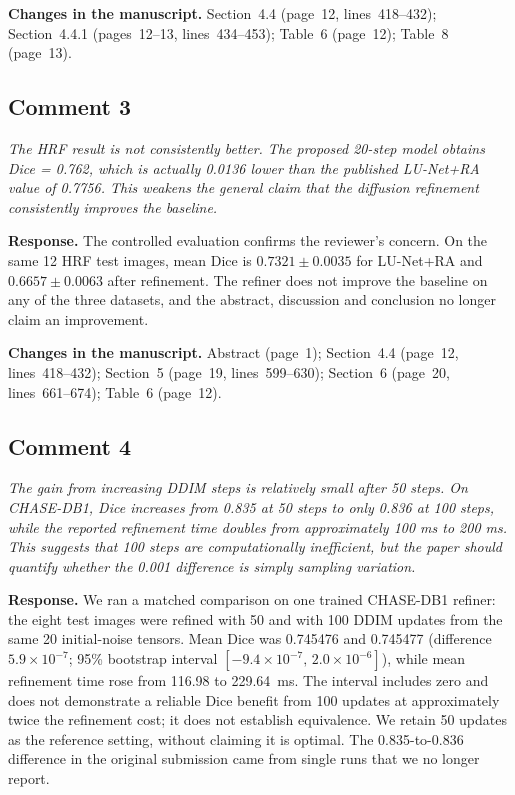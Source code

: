 \documentclass[11pt,a4paper]{article}
\newenvironment{revcomment}{\par\medskip\noindent\begin{minipage}{\linewidth}\itshape}{\end{minipage}\par\smallskip}
\begin{document}
\textbf{Changes in the manuscript.} Section~4.4 (page~12, lines~418--432); Section~4.4.1 (pages~12--13, lines~434--453); Table~6 (page~12); Table~8 (page~13).

\subsection*{Comment 3}
\begin{revcomment}The HRF result is not consistently better. The proposed 20-step model obtains Dice = 0.762, which is actually 0.0136 lower than the published LU-Net+RA value of 0.7756. This weakens the general claim that the diffusion refinement consistently improves the baseline.\end{revcomment}
\textbf{Response.} The controlled evaluation confirms the reviewer's concern. On the same 12 HRF test images, mean Dice is $0.7321\pm0.0035$ for LU-Net+RA and $0.6657\pm0.0063$ after refinement. The refiner does not improve the baseline on any of the three datasets, and the abstract, discussion and conclusion no longer claim an improvement.

\textbf{Changes in the manuscript.} Abstract (page~1); Section~4.4 (page~12, lines~418--432); Section~5 (page~19, lines~599--630); Section~6 (page~20, lines~661--674); Table~6 (page~12).

\subsection*{Comment 4}
\begin{revcomment}The gain from increasing DDIM steps is relatively small after 50 steps. On CHASE-DB1, Dice increases from 0.835 at 50 steps to only 0.836 at 100 steps, while the reported refinement time doubles from approximately 100 ms to 200 ms. This suggests that 100 steps are computationally inefficient, but the paper should quantify whether the 0.001 difference is simply sampling variation.\end{revcomment}
\textbf{Response.} We ran a matched comparison on one trained CHASE-DB1 refiner: the eight test images were refined with 50 and with 100 DDIM updates from the same 20 initial-noise tensors. Mean Dice was 0.745476 and 0.745477 (difference $5.9\times10^{-7}$; 95\% bootstrap interval $[-9.4\times10^{-7},\,2.0\times10^{-6}]$), while mean refinement time rose from 116.98 to 229.64~ms. The interval includes zero and does not demonstrate a reliable Dice benefit from 100 updates at approximately twice the refinement cost; it does not establish equivalence. We retain 50 updates as the reference setting, without claiming it is optimal. The 0.835-to-0.836 difference in the original submission came from single runs that we no longer report.
\end{document}
